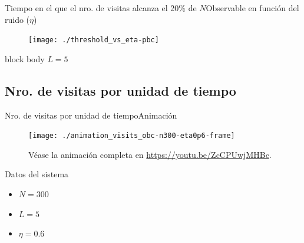 \documentclass{beamer}
\begin{document}
            \begin{frame}{Tiempo en el que el nro. de visitas alcanza el 20\% de $N$}{Observable en función del ruido ($\eta$)}
                \begin{figure}[H!]
                    \texttt{[image: ./threshold\_vs\_eta-pbc]}
                    \label{fig:pbc_3}
                \end{figure}
                \begin{beamercolorbox}[sep=5pt,center]{block body}
                    \small{$L=5$}
                \end{beamercolorbox}
            \end{frame}

        \subsection{Nro. de visitas por unidad de tiempo}

            \begin{frame}{Nro. de visitas por unidad de tiempo}{Animación}
                \begin{minipage}[t]{0.60\textwidth}
                    \begin{figure}[H!]
                        \texttt{[image: ./animation\_visits\_obc-n300-eta0p6-frame]}
                        \caption*{Véase la animación completa en \url{https://youtu.be/ZcCPUwjMHBc}.}
                        \label{fig:obc_1}
                    \end{figure}
                \end{minipage}
                \hfill
                \begin{minipage}[t]{0.30\textwidth}
                    \begin{block}{Datos del sistema}
                        \begin{itemize}
                            \item $N=300$
                            \item $L=5$
                            \item $\eta=0.6$
                        \end{itemize}
                    \end{block}
                \end{minipage}
            \end{frame}
\end{document}
